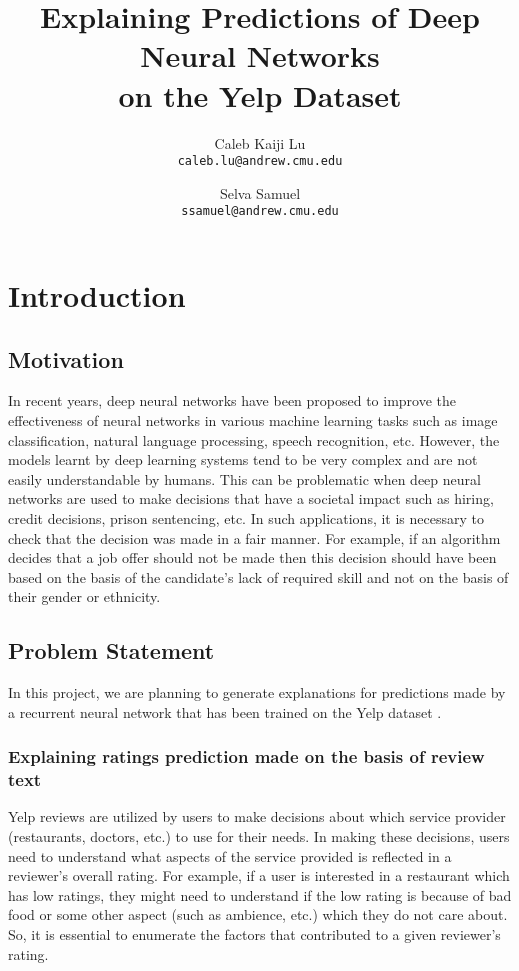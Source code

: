 \documentclass[11pt, twocolumn]{article}
\title{Explaining Predictions of Deep Neural Networks \\ on the Yelp Dataset}
\author{
	Caleb Kaiji Lu \\
	{\tt caleb.lu@andrew.cmu.edu}
	\and
	Selva Samuel \\
	{\tt ssamuel@andrew.cmu.edu}
}
\date{}
\begin{document}
\maketitle

\section{Introduction}

\subsection{Motivation}

In recent years, deep neural networks have been proposed to improve the effectiveness of neural networks in various machine learning tasks such as image classification, natural language processing, speech recognition, etc. However, the models learnt by deep learning systems tend to be very complex and are not easily understandable by humans. This can be problematic when deep neural networks are used to make decisions that have a societal impact such as hiring, credit decisions, prison sentencing, etc. In such applications, it is necessary to check that the decision was made in a fair manner. For example, if an algorithm decides that a job offer should not be made then this decision should have been based on the basis of the candidate's lack of required skill and not on the basis of their gender or ethnicity.

\subsection{Problem Statement}

In this project, we are planning to generate explanations for predictions made by a recurrent neural network that has been trained on the Yelp dataset \cite{Yelp2017}.

\subsubsection{Explaining ratings prediction made on the basis of review text}

Yelp reviews are utilized by users to make decisions about which service provider (restaurants, doctors, etc.) to use for their needs. In making these decisions, users need to understand what aspects of the service provided is reflected in a reviewer's overall rating. For example, if a user is interested in a restaurant which has low ratings, they might need to understand if the low rating is because of bad food or some other aspect (such as ambience, etc.) which they do not care about. So, it is essential to enumerate the factors that contributed to a given reviewer's rating.
\end{document}
